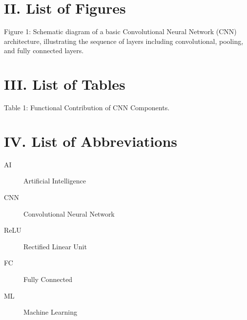 \documentclass[12pt]{article}
\begin{document}
\newpage
\renewcommand{\contentsname}{Table of Contents} %
\tableofcontents
\newpage

\newpage
\section*{II. List of Figures}

Figure 1: Schematic diagram of a basic Convolutional Neural Network (CNN) architecture, illustrating the sequence of layers including convolutional, pooling, and fully connected layers.

\newpage
\section*{III. List of Tables}

Table 1: Functional Contribution of CNN Components.

\newpage
\section*{IV. List of Abbreviations}

\begin{description}
  \item[AI] Artificial Intelligence
  \item[CNN] Convolutional Neural Network
  \item[ReLU] Rectified Linear Unit
  \item[FC] Fully Connected
  \item[ML] Machine Learning
\end{description}
\newpage

\newpage
\end{document}
